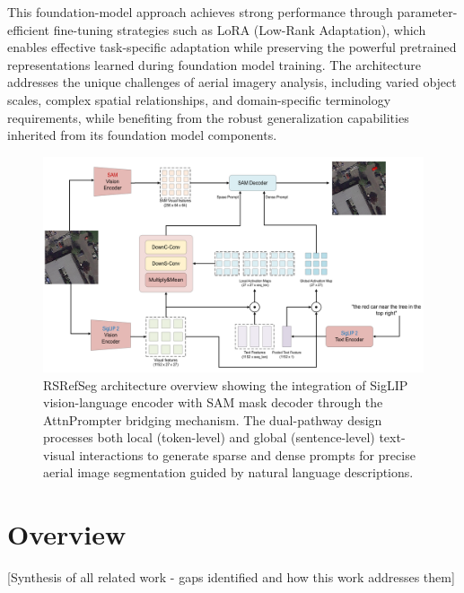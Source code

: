 This foundation-model approach achieves strong performance through parameter-efficient fine-tuning strategies such as LoRA (Low-Rank Adaptation), which enables effective task-specific adaptation while preserving the powerful pretrained representations learned during foundation model training. The architecture addresses the unique challenges of aerial imagery analysis, including varied object scales, complex spatial relationships, and domain-specific terminology requirements, while benefiting from the robust generalization capabilities inherited from its foundation model components.

\begin{figure}[H]
\centering
\includegraphics[width=\textwidth]{Images/clipsam.png}
\caption{RSRefSeg architecture overview showing the integration of SigLIP vision-language encoder with SAM mask decoder through the AttnPrompter bridging mechanism. The dual-pathway design processes both local (token-level) and global (sentence-level) text-visual interactions to generate sparse and dense prompts for precise aerial image segmentation guided by natural language descriptions.}
\label{fig:rsrefseg_architecture}
\end{figure}

\section{Overview}

[Synthesis of all related work - gaps identified and how this work addresses them] %